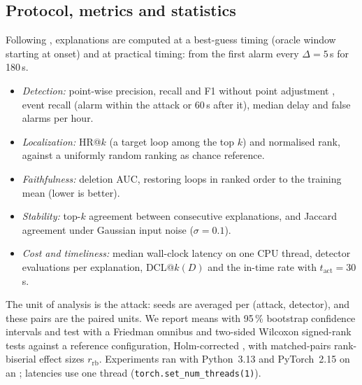 \subsection{Protocol, metrics and statistics}
Following \citet{fung2024attributions}, explanations are computed at a best-guess timing (oracle window starting at onset) and at practical timing: from the first alarm every $\Delta=5$\,s for 180\,s.
\begin{itemize}
\item \emph{Detection:} point-wise precision, recall and F1 without point adjustment \citep{kim2022rigorous}, event recall (alarm within the attack or 60\,s after it), median delay and false alarms per hour.
\item \emph{Localization:} HR@$k$ (a target loop among the top $k$) and normalised rank, against a uniformly random ranking as chance reference.
\item \emph{Faithfulness:} deletion AUC, restoring loops in ranked order to the training mean (lower is better).
\item \emph{Stability:} top-$k$ agreement between consecutive explanations, and Jaccard agreement under Gaussian input noise ($\sigma=0.1$).
\item \emph{Cost and timeliness:} median wall-clock latency on one CPU thread, detector evaluations per explanation, DCL@$k(D)$ and the in-time rate with $t_{\mathrm{act}}=30$\,s.
\end{itemize}
The unit of analysis is the attack: seeds are averaged per (attack, detector), and these pairs are the paired units. We report means with 95\,\% bootstrap confidence intervals and test with a Friedman omnibus and two-sided Wilcoxon signed-rank tests against a reference configuration, Holm-corrected \citep{demsar2006statistical,holm1979simple}, with matched-pairs rank-biserial effect sizes $r_{\mathrm{rb}}$. Experiments ran with Python~3.13 and PyTorch~2.15 on an \CPUmodel{}; latencies use one thread (\texttt{torch.set\_num\_threads(1)}).
